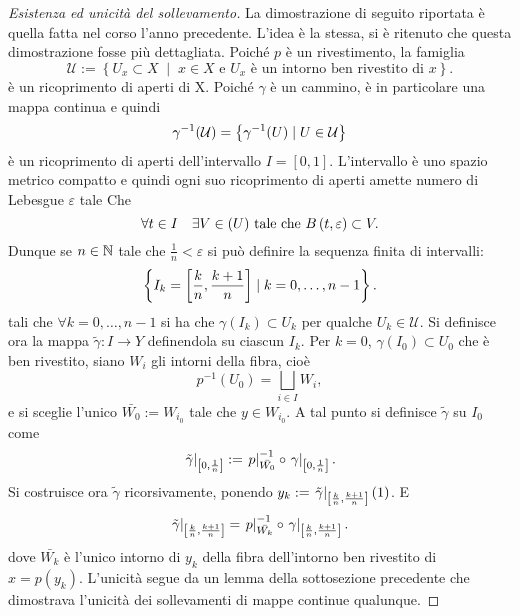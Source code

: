 \documentclass[]{article}
\begin{document}
\begin{proof} [Esistenza ed unicit\`a del sollevamento] \nl
    La dimostrazione di seguito riportata \`e quella fatta nel corso l'anno precedente. L'idea \`e la stessa, si \`e ritenuto che questa dimostrazione fosse pi\`u dettagliata. \nl
    Poich\'e $p$ \`e un rivestimento, la famiglia 
    \[
        \mathcal{U} := \left\{ U_x \subset X \;\middle|\; x \in X \text{ e } U_x \text{ è un intorno ben rivestito di } x \right\}.
    \]
    \`e un ricoprimento di aperti di X. \nl
    Poich\'e $\gamma$ \`e un cammino, \`e in particolare una mappa continua e quindi
    \[
        \gamma^{-1}(\mathcal{U}) = \left\{ \gamma^{-1}(U) \mid U \in \mathcal{U} \right\}
    \]
    \`e un ricoprimento di aperti dell'intervallo $I = [0, 1]$. \nl
    L'intervallo \`e uno spazio metrico compatto e quindi ogni suo ricoprimento di aperti amette numero di Lebesgue $\varepsilon$ tale Che
    \[
        \forall t \in I \quad \exists V \in \mathcal(U) \text{ tale che } B\left(t, \varepsilon\right) \subset V.
    \]
    Dunque se $n \in \mathbb{N}$ tale che $\frac{1}{n} < \varepsilon$ si pu\`o definire la sequenza finita di intervalli:
    \[
        \left\{ I_k = \left[\frac{k}{n}, \frac{k+1}{n}\right] \mid k = 0, \ldots, n-1 \right\}.
    \]
    tali che $\forall k = 0, \ldots, n-1$ si ha che $\gamma(I_k) \subset U_k$ per qualche $U_k \in \mathcal{U}$. \nl
    Si definisce ora la mappa $\tilde{\gamma}: I \to Y$ definendola su ciascun $I_k$. \nl
    Per $k = 0$, $\gamma(I_0) \subset U_0$ che \`e ben rivestito, siano $W_i$ gli intorni della fibra, cio\`e
    \[ 
        p^{-1}(U_0) = \bigsqcup_{i \in I} W_i,
    \]
    e si sceglie l'unico $\bar{W_0} := W_{i_0}$ tale che $y \in W_{i_0}$. \nl
    A tal punto si definisce $\tilde{\gamma}$ su $I_0$ come
    \[
        \left. \tilde{\gamma} \right|_{\left[0, \frac{1}{n}\right]} := \left. p \right|_{\bar{W_0}}^{-1} \circ \left. \gamma \right|_{\left[0,\frac{1}{n}\right]}.
    \]
    Si costruisce ora $\tilde{\gamma}$ ricorsivamente, ponendo $y_k := \left. \tilde{\gamma} \right|_{\left[\frac{k}{n}, \frac{k+1}{n}\right]}(1)$.
    E
    \[
        \left. \tilde{\gamma} \right|_{\left[\frac{k}{n}, \frac{k+1}{n}\right]} = \left. p \right|_{\bar{W_k}}^{-1} \circ \left. \gamma \right|_{\left[\frac{k}{n}, \frac{k+1}{n}\right]}.
    \]
    dove $\bar{W_k}$ \`e l'unico intorno di $y_k$ della fibra dell'intorno ben rivestito di $x = p(y_k).$ \nl
    L'unicit\`a segue da un lemma della sottosezione precedente che dimostrava l'unicit\`a dei sollevamenti
    di mappe continue qualunque.    
\end{proof}
\end{document}
